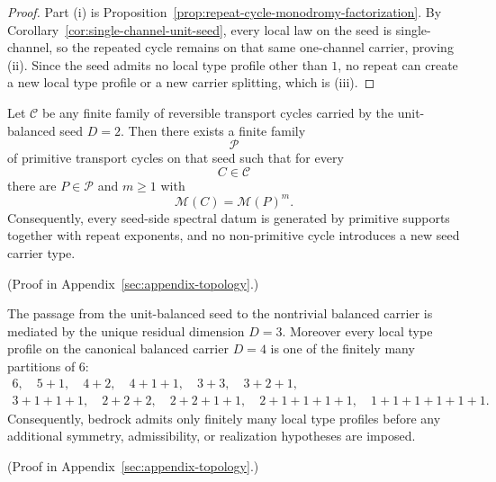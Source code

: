 \begin{proof}
Part (i) is Proposition~\ref{prop:repeat-cycle-monodromy-factorization}. By
Corollary~\ref{cor:single-channel-unit-seed}, every local law on the seed is
single-channel, so the repeated cycle remains on that same one-channel carrier,
proving (ii). Since the seed admits no local type profile other than \(1\), no
repeat can create a new local type profile or a new carrier splitting, which is
(iii).
\end{proof}

\begin{corollary}
\label{cor:d2-primitive-support-profile}
Let \(\mathcal C\) be any finite family of reversible transport cycles carried
by the unit-balanced seed \(D=2\). Then there exists a finite family
\[
\mathcal P
\]
of primitive transport cycles on that seed such that for every
\[
C\in\mathcal C
\]
there are \(P\in\mathcal P\) and \(m\ge 1\) with
\[
\mathcal M(C)=\mathcal M(P)^m.
\]
Consequently, every seed-side spectral datum is generated by primitive
supports together with repeat exponents, and no non-primitive cycle introduces
a new seed carrier type.
\end{corollary}

(Proof in Appendix~\ref{sec:appendix-topology}.)

\begin{theorem}
\label{thm:finite-local-type-profiles}
The passage from the unit-balanced seed to the nontrivial balanced carrier is
mediated by the unique residual dimension $D=3$. Moreover every local type
profile on the canonical balanced carrier $D=4$ is one of the finitely many
partitions of $6$:
\[
\begin{gathered}
6,\quad
5+1,\quad
4+2,\quad
4+1+1,\quad
3+3,\quad
3+2+1,\\
3+1+1+1,\quad
2+2+2,\quad
2+2+1+1,\quad
2+1+1+1+1,\quad
1+1+1+1+1+1.
\end{gathered}
\]
Consequently, bedrock admits only finitely many local type profiles before any
additional symmetry, admissibility, or realization hypotheses are imposed.
\end{theorem}

(Proof in Appendix~\ref{sec:appendix-topology}.)

